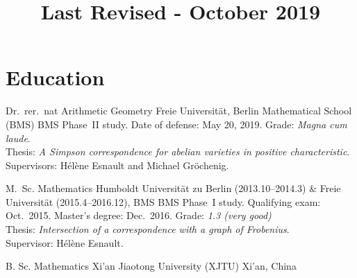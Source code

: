 \documentclass[10pt,a4paper,roman]{moderncv}
\title{\normalsize Last Revised - October 2019}
\begin{document}
\maketitle





\section{Education}
%
{Dr.\ rer.\ nat}%
{Arithmetic Geometry}%
{Freie Universität, Berlin Mathematical School (BMS)}%
{}%
{
    BMS Phase~II study. Date of defense: May 20, 2019. Grade: \emph{Magna cum
    laude}.\\
    Thesis: \emph{A Simpson correspondence for abelian varieties in positive
    characteristic}.\\
    Supervisors: Hélène Esnault and Michael Gröchenig.
}

{M.\ Sc.}%
{Mathematics}%
{%
    Humboldt Universität zu Berlin (2013.10--2014.3) \&
    Freie Universität (2015.4--2016.12), BMS
}%
{}%
{%
    BMS Phase~I study. Qualifying exam: Oct.\ 2015.
    Master's degree: Dec.\ 2016. Grade: \emph{1.3 (very good)}\\
    Thesis: \emph{Intersection of a correspondence with a graph of Frobenius}.\\
    Supervisor: Hélène Esnault.
}

%
{B. Sc.}%
{Mathematics}%
{Xi'an Jiaotong University (XJTU)}%
{Xi'an, China}{}%
\end{document}
